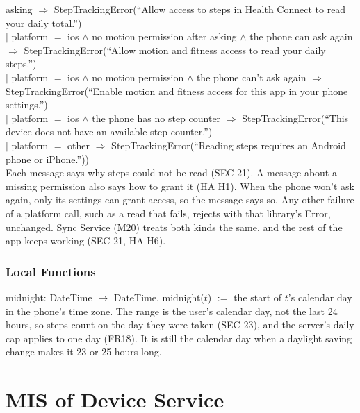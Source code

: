 \documentclass[12pt, titlepage]{article}
\begin{document}
\begin{itemize}
{  asking $\Rightarrow$ StepTrackingError(``Allow access to steps in Health
  Connect to read your daily total.'')\\
  \hspace*{1em}$|$ platform $=$ ios $\land$ no motion permission after asking
  $\land$ the phone can ask again $\Rightarrow$ StepTrackingError(``Allow motion
  and fitness access to read your daily steps.'')\\
  \hspace*{1em}$|$ platform $=$ ios $\land$ no motion permission $\land$ the
  phone can't ask again $\Rightarrow$ StepTrackingError(``Enable motion and
  fitness access for this app in your phone settings.'')\\
  \hspace*{1em}$|$ platform $=$ ios $\land$ the phone has no step counter
  $\Rightarrow$ StepTrackingError(``This device does not have an available step
  counter.'')\\
  \hspace*{1em}$|$ platform $=$ other $\Rightarrow$ StepTrackingError(``Reading
  steps requires an Android phone or iPhone.''))\\
  Each message says why steps could not be read (SEC-21). A message about a
  missing permission also says how to grant it (HA H1). When the phone won't
  ask again, only its settings can grant access, so the message says so. Any other failure of a platform call, such as
  a read that fails, rejects with that library's Error, unchanged. Sync Service
  (M20) treats both kinds the same, and the rest of the app keeps working
  (SEC-21, HA H6).\par}
\end{itemize}

\subsubsection{Local Functions}

\noindent midnight: DateTime $\rightarrow$ DateTime, midnight($t$) $:=$ the
start of $t$'s calendar day in the phone's time zone. The range is the user's
calendar day, not the last 24 hours, so steps count on the day they were taken
(SEC-23), and the server's daily cap applies to one day (FR18). It is still the
calendar day when a daylight saving change makes it 23 or 25 hours long.

\newpage

\section{MIS of Device Service} \label{MisDevice}
\end{document}
